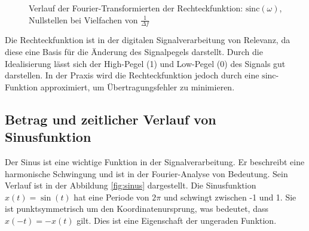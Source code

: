 \begin{figure}[H]
    \centering
    \caption{Verlauf der Fourier-Transformierten der Rechteckfunktion: $\mathrm{sinc}(\omega)$, Nullstellen bei Vielfachen von $\frac{1}{\Delta f}$}
    \label{fig:fourier_rechteck}
\end{figure}

Die Rechteckfunktion ist in der digitalen Signalverarbeitung von Relevanz, da diese eine Basis für die Änderung des Signalpegels darstellt. Durch die Idealisierung lässt sich der High-Pegel (1) und Low-Pegel (0) des Signals gut darstellen. In der Praxis wird die Rechteckfunktion jedoch durch eine $\mathrm{sinc}$-Funktion approximiert, um Übertragungsfehler zu minimieren.

\subsection{Betrag und zeitlicher Verlauf von Sinusfunktion}
Der Sinus ist eine wichtige Funktion in der Signalverarbeitung.
Er beschreibt eine harmonische Schwingung und ist in der Fourier-Analyse von Bedeutung. Sein Verlauf ist in der Abbildung \ref{fig:sinus} dargestellt.
Die Sinusfunktion $x(t) = \sin(t)$ hat eine Periode von $2\pi$ und schwingt zwischen -1 und 1. Sie ist punktsymmetrisch um den Koordinatenursprung, was bedeutet, dass $x(-t) = -x(t)$ gilt. Dies ist eine Eigenschaft der ungeraden Funktion.

